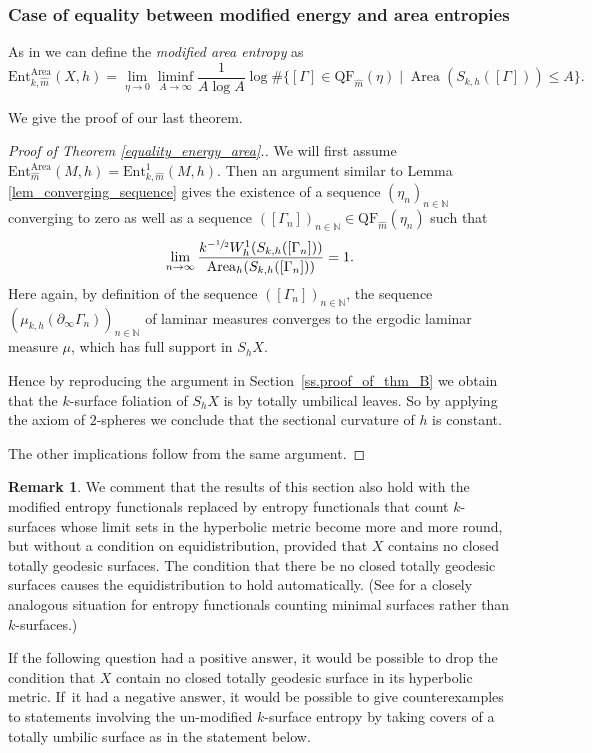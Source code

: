 \documentclass[JEP,XML,SOM,Unicode,NoEqCountersInSection,published]{cedram}
\newcommand{\ksurface}{$k$\nobreakdash-surface\xspace}
\newcommand{\ksurfaces}{$k$\nobreakdash-surfaces\xspace}
\theoremstyle{plain}
\theoremstyle{definition}
\newtheorem{remark}[theorem]{Remark}
\newcommand{\Ent}{\mathrm{Ent}}
\newcommand{\QF}{\mathrm{QF}}
\newcommand{\bord}{\partial_{\infty}}
\DeclareMathOperator{\Area}{Area}
\begin{document}
\subsubsection{Case of equality between modified energy and area entropies} \label{sss.equality_modified_entropies}

As in \cite{ALS,MN_currents} we can define the \emph{modified area entropy} as
\begin{equation*}
\Ent^{\Area}_{k,\hat m}(X,h)=\lim_{\eta\to 0}\liminf_{A\to\infty}\frac{1}{A\log A}\log\#\bigl\{[\Gamma]\in\QF_{\hat m}(\eta)\mid \Area(S_{k,h}([\Gamma]))\leq A\bigr\}.
\end{equation*}

We give the proof of our last theorem.

\begin{proof}[Proof of Theorem \ref{equality_energy_area}.]
We will first assume $\Ent^{\Area}_{\hat m}(M,h)=\Ent^{1}_{k,\hat m}(M,h)$. Then an argument similar to Lemma \ref{lem_converging_sequence} gives the existence of a sequence $(\eta_n)_{n\in\mathbb{N}}$ converging to zero as well as a sequence $([\Gamma_n])_{n\in\mathbb{N}}\in\QF_{\hat m}(\eta_n)$ such that
\begin{equation*}
\lim_{n\to\infty}\frac{k^{-\sfrac{1}{2}}W^{1}_{h}(S_{k,h}([\Gamma_n]))}{\Area_h(S_{k,h}([\Gamma_n]))}=1.
\end{equation*}
Here again, by definition of the sequence $([\Gamma_n])_{n\in\mathbb{N}}$, the sequence $(\mu_{k,h}(\bord \Gamma_n))_{n\in\mathbb{N}}$ of laminar measures converges to the ergodic laminar measure $\mu$, which has full support in $S_hX$.

Hence by reproducing the argument in Section~\ref{ss.proof_of_thm_B} we obtain that the \ksurface foliation of $S_hX$ is by totally umbilical leaves. So by applying the axiom of $2$-spheres we conclude that the sectional curvature of $h$ is constant.

The other implications follow from the same argument.
\end{proof}

\begin{remark} \label{remarkattheend}
We comment that the results of this section also hold with the modified entropy functionals replaced by entropy functionals that count \ksurfaces whose limit sets in the hyperbolic metric become more and more round, but without a condition on equidistribution, provided that $X$ contains no closed totally geodesic surfaces. The condition that there be no closed totally geodesic surfaces causes the equidistribution to hold automatically. (See \cite{MN_currents} for a closely analogous situation for entropy functionals counting minimal surfaces rather than \ksurfaces.)

If the following question had a positive answer, it would be possible to drop the condition that $X$ contain no closed totally geodesic surface in its hyperbolic metric. If~it had a negative answer, it would be possible to give counterexamples to statements involving the un-modified \ksurface entropy by taking covers of a totally umbilic surface as in the statement below.
\end{remark}
\end{document}
